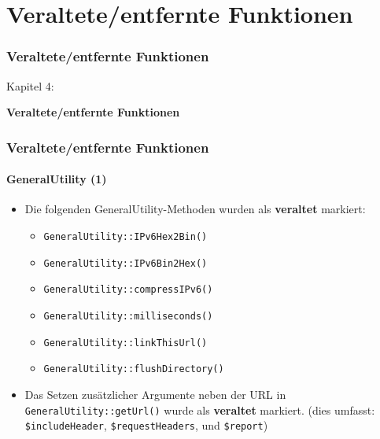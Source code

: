 %

\section{Veraltete/entfernte Funktionen}
\begin{frame}[fragile]
	\frametitle{Veraltete/entfernte Funktionen}

	\begin{center}\huge{Kapitel 4:}\end{center}
	\begin{center}\huge{\color{typo3darkgrey}\textbf{Veraltete/entfernte Funktionen}}\end{center}

\end{frame}


\begin{frame}[fragile]
	\frametitle{Veraltete/entfernte Funktionen}
	\framesubtitle{GeneralUtility (1)}

	\begin{itemize}
		\item Die folgenden GeneralUtility-Methoden wurden als \textbf{veraltet} markiert:
			\begin{itemize}\smaller
				\item \texttt{GeneralUtility::IPv6Hex2Bin()}
				\item \texttt{GeneralUtility::IPv6Bin2Hex()}
				\item \texttt{GeneralUtility::compressIPv6()}
				\item \texttt{GeneralUtility::milliseconds()}
				\item \texttt{GeneralUtility::linkThisUrl()}
				\item \texttt{GeneralUtility::flushDirectory()}
			\end{itemize}\normalsize
			\vspace{0.4cm}

		\item Das Setzen zusätzlicher Argumente neben der URL in \texttt{GeneralUtility::getUrl()}
			wurde als \textbf{veraltet} markiert.\newline
			\smaller
				(dies umfasst: \texttt{\$includeHeader}, \texttt{\$requestHeaders}, und \texttt{\$report})
			\normalsize

	\end{itemize}

\end{frame}

